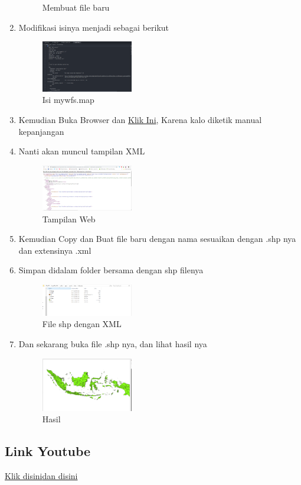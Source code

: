 \begin{enumerate}
\begin{figure}[H]
		\centering
		\caption{Membuat file baru}
    \end{figure}
  \item Modifikasi isinya menjadi sebagai berikut
  \hfill\break 
    \begin{figure}[H]
		\includegraphics[width=4cm]{figures/1174051/4/10.png}
		\centering
		\caption{Isi mywfs.map }
    \end{figure}
  \item Kemudian Buka Browser dan \href{http://localhost:8080/cgi-bin/mapserv.exe?map=/ms4w/apps/mywfs/mywfs.map&SERVICE=WFS&VERSION=1.0.0&REQUEST=GetCapabilities}{Klik Ini}, Karena kalo diketik manual kepanjangan
  \item Nanti akan muncul tampilan XML
  \hfill\break
    \begin{figure}[H]
		\includegraphics[width=4cm]{figures/1174051/4/11.png}
		\centering
		\caption{Tampilan Web}
    \end{figure}
  \item Kemudian Copy dan Buat file baru dengan nama sesuaikan dengan .shp nya dan extensinya .xml
  \item Simpan didalam folder bersama dengan shp filenya
  \hfill\break
  \begin{figure}[H]
  \includegraphics[width=4cm]{figures/1174051/4/12.png}
  \centering
  \caption{File shp dengan XML}
  \end{figure}
  \item Dan sekarang buka file .shp nya, dan lihat hasil nya
  \hfill\break
  \begin{figure}[H]
  \includegraphics[width=4cm]{figures/1174051/4/13.png}
  \centering
  \caption{Hasil}
  \end{figure}
\end{enumerate}
\subsection{Link Youtube}
\href{https://www.youtube.com/watch?v=yI4wPgw1QVE&feature=youtu.be}{Klik disini}\href{https://www.youtube.com/watch?v=_8QJI1b0y88&feature=youtu.be}{dan disini}